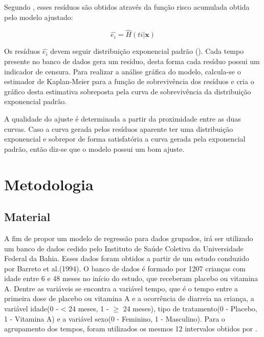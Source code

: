 \documentclass[a4paper,12pt]{article}
\begin{document}
Segundo \cite{colosimo}, esses resíduos são obtidos através da função risco acumulada obtida pelo modelo ajustado:

\begin{equation} \label{eq:cox}
  \hat{e_i} = \hat{H}(ti|\boldsymbol{x})
\end{equation}

Os resíduos $\hat{e_i}$ devem seguir distribuição exponencial padrão (\cite{Lawless}). Cada tempo presente no banco de dados gera um resíduo, desta forma cada resíduo possui um indicador de censura. Para realizar a análise gráfica do modelo, calcula-se o estimador de Kaplan-Meier para a função de sobrevivência dos resíduos e cria o gráfico desta estimativa sobreposta pela curva de sobrevivência da distribuição exponencial padrão.

A qualidade do ajuste é determinada a partir da proximidade entre as duas curvas. Caso a curva gerada pelos resíduos aparente ter uma distribuição exponencial e sobrepor de forma satisfatória a curva gerada pela exponencial padrão, então diz-se que o modelo possui um bom ajuste.


\newpage
\section{Metodologia}
\noindent

\subsection{Material}

A fim de propor um modelo de regressão para dados grupados, irá ser utilizado um banco de dados cedido pelo Instituto de Saúde Coletiva da Universidade Federal da Bahia. Esses dados foram obtidos a partir de um estudo conduzido por Barreto et al.(1994). O banco de dados é formado por 1207 crianças com idade entre 6 e 48 meses no início do estudo, que receberam placebo ou vitamina A. Dentre as variáveis se encontra a variável tempo, que é o tempo entre a primeira dose de placebo ou vitamina A e a ocorrência de diarreia na criança, a variável idade(0 - < 24 meses, 1 - $\ge$ 24 meses), tipo de tratamento(0 - Placebo, 1 - Vitamina A) e a variável sexo(0 - Feminino, 1 - Masculino). Para o agrupamento dos tempos, foram utilizados os mesmos 12 intervalos obtidos por \cite{elisangela}.
\end{document}
